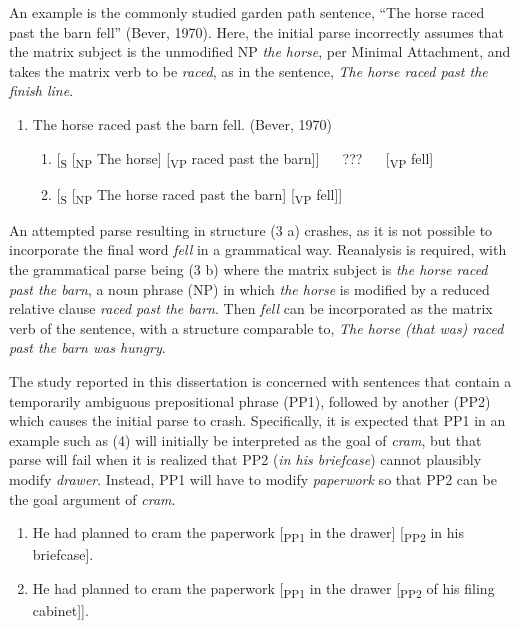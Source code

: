 \documentclass[11pt,oneside]{book}
\providecommand{\tightlist}{%
  \setlength{\itemsep}{0pt}\setlength{\parskip}{0pt}}
\begin{document}
An example is the commonly studied garden path sentence, ``The horse raced past the barn fell'' (Bever, 1970). Here, the initial parse incorrectly assumes that the matrix subject is the unmodified NP \emph{the horse}, per Minimal Attachment, and takes the matrix verb to be \emph{raced}, as in the sentence, \emph{The horse raced past the finish line}.

\begin{enumerate}
\def\labelenumi{(\arabic{enumi})}
\setcounter{enumi}{2}
\tightlist
\item
  The horse raced past the barn fell. (Bever, 1970)

  \begin{enumerate}
  \def\labelenumii{\alph{enumii})}
  \tightlist
  \item
    {[}\textsubscript{S} {[}\textsubscript{NP} The horse{]} {[}\textsubscript{VP} raced past the barn{]}{]}   ???   {[}\textsubscript{VP} fell{]}
  \item
    {[}\textsubscript{S} {[}\textsubscript{NP} The horse raced past the barn{]} {[}\textsubscript{VP} fell{]}{]}
  \end{enumerate}
\end{enumerate}

An attempted parse resulting in structure (3 a) crashes, as it is not possible to incorporate the final word \emph{fell} in a grammatical way. Reanalysis is required, with the grammatical parse being (3 b) where the matrix subject is \emph{the horse raced past the barn}, a noun phrase (NP) in which \emph{the horse} is modified by a reduced relative clause \emph{raced past the barn}. Then \emph{fell} can be incorporated as the matrix verb of the sentence, with a structure comparable to, \emph{The horse (that was) raced past the barn was hungry}.

The study reported in this dissertation is concerned with sentences that contain a temporarily ambiguous prepositional phrase (PP1), followed by another (PP2) which causes the initial parse to crash. Specifically, it is expected that PP1 in an example such as (4) will initially be interpreted as the goal of \emph{cram}, but that parse will fail when it is realized that PP2 (\emph{in his briefcase}) cannot plausibly modify \emph{drawer}. Instead, PP1 will have to modify \emph{paperwork} so that PP2 can be the goal argument of \emph{cram}.

\begin{enumerate}
\def\labelenumi{(\arabic{enumi})}
\setcounter{enumi}{3}
\item
  He had planned to cram the paperwork {[}\textsubscript{PP1} in the drawer{]} {[}\textsubscript{PP2} in his briefcase{]}.
\item
  He had planned to cram the paperwork {[}\textsubscript{PP1} in the drawer {[}\textsubscript{PP2} of his filing cabinet{]}{]}.
\end{enumerate}
\end{document}
